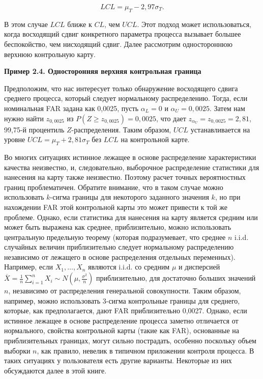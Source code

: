 \[
LCL = \mu_T - 2,97\sigma_T.
\]

В этом случае \(LCL\) ближе к \(CL\), чем \(UCL\). Этот подход может использоваться, когда восходящий сдвиг конкретного параметра процесса вызывает большее беспокойство, чем нисходящий сдвиг. Далее рассмотрим одностороннюю верхнюю контрольную карту.

\noindent\textbf{Пример 2.4. Односторонняя верхняя контрольная граница}

Предположим, что нас интересует только обнаружение восходящего сдвига среднего процесса, который следует нормальному распределению. Тогда, если номинальная FAR задана как 0,0025, пусть \(\alpha_L = 0\) и \(\alpha_U = 0,0025\). Затем нам нужно найти \(z_{0,0025}\) из \(P(Z \geq z_{0,0025}) = 0,0025\), что дает \(z_{\alpha_U} = z_{0,0025} = 2,81\), 99,75-й процентиль \(Z\)-распределения. Таким образом, \(UCL\) устанавливается на уровне \(UCL = \mu_T + 2,81\sigma_T\) без \(LCL\) на контрольной карте.

Во многих ситуациях истинное лежащее в основе распределение характеристики качества неизвестно, и, следовательно, выборочное распределение статистики для нанесения на карту также неизвестно. Поэтому расчет точных вероятностных границ проблематичен. Обратите внимание, что в таком случае можно использовать \(k\)-сигма границы для некоторого заданного значения \(k\), но при нахождении FAR этой контрольной карты это может привести к той же проблеме. Однако, если статистика для нанесения на карту является средним или может быть выражена как среднее, приблизительно, можно использовать центральную предельную теорему (которая подразумевает, что среднее \(n\) i.i.d. случайных величин приблизительно следует нормальному распределению независимо от лежащего в основе распределения отдельных переменных). Например, если \(X_1, \ldots, X_n\) являются i.i.d. со средним \(\mu\) и дисперсией $\overline{X} = \frac{1}{n}\sum_{i=1}^n X_i \sim N\left(\mu, \frac{\sigma^2}{n}\right)$ приблизительно, для достаточно больших значений $n$, независимо от распределения генеральной совокупности. Таким образом, например, можно использовать 3-сигма контрольные границы для среднего, которые, как предполагается, дают FAR приблизительно 0,0027. Однако, если истинное лежащее в основе распределение процесса заметно отличается от нормального, свойства контрольной карты (такие как FAR), основанные на приблизительных границах, могут сильно пострадать, особенно поскольку объем выборки \(n\), как правило, невелик в типичном приложении контроля процесса. В таких ситуациях у пользователя есть другие варианты. Некоторые из них обсуждаются далее в этой книге.